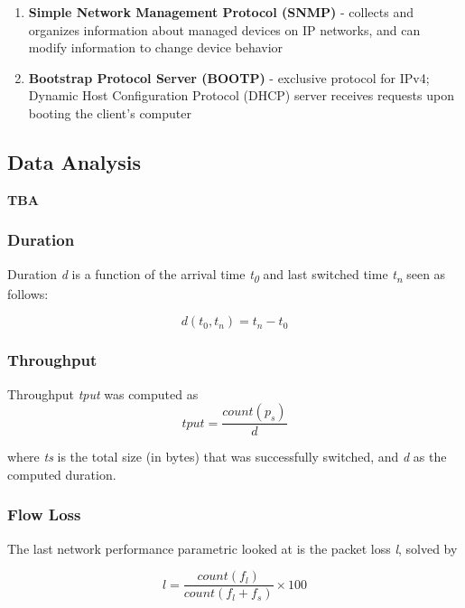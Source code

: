 \documentclass[journal]{IEEE/IEEEtran}
\begin{document}
\begin{enumerate}
\item \textbf{Simple Network Management Protocol (SNMP)} - collects and organizes information about managed devices on IP networks, and can modify information to change device behavior

\item \textbf{Bootstrap Protocol Server (BOOTP)} - exclusive protocol for IPv4; Dynamic Host Configuration Protocol (DHCP) server receives requests upon booting the client's computer

\end{enumerate}


\subsection{Data Analysis}
\textbf{TBA}

\subsubsection{Duration}

Duration \textit{d} is a function of the arrival time \textit{t\textsubscript{0}} and last switched time \textit{t\textsubscript{n}} seen as follows:

\[
	d(t_0, t_n) = t_n - t_0
\]

\subsubsection{Throughput}

Throughput \textit{tput} was computed as 
\[
	tput = \frac{count(p_s)}{d}
\]

where \textit{ts} is the total size (in bytes) that was successfully switched, and \textit{d} as the computed duration. 

\subsubsection{Flow Loss}

The last network performance parametric looked at is the packet loss \textit{l}, solved by

\[
	l = \frac{count(f_l)}{count(f_l + f_s)} \times 100
\]
\end{document}
